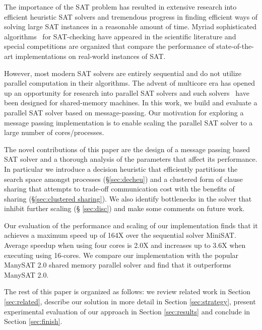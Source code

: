 \documentclass[letterpaper, compsoc, conference]{IEEEtran}
\begin{document}
The importance of the SAT problem has resulted in extensive research into
efficient heuristic SAT solvers and tremendous progress in finding efficient
ways of solving large SAT instances in a reasonable amount of time.  Myriad
sophisticated algorithms~\cite{Davis1962, Selman1992, Zhang94sato,
Selman95localsearch, PSATO, Bohm96, Silva1997GRASP, Moskewicz2001Chaff,
Forman02NagSat, MiniSat, Blochinger2003, Chrabakh03gradsat, Jurkowiak2005,
Lewis2007MiraXT, PMiniSat, Gil08Pmsat, ManySAT} for SAT-checking have appeared
in the scientific literature and special competitions \cite{SATRace2008} are
organized that compare the performance of state-of-the-art implementations on
real-world instances of SAT. 

However, most modern SAT solvers are entirely sequential and do not utilize
parallel computation in their algorithms. The advent of multicore era has
opened up an opportunity for research into parallel SAT solvers and such 
solvers~\cite{ManySAT} have been designed for shared-memory
machines.  In this work, we build and evaluate a parallel SAT solver based on
message-passing. Our motivation for exploring a message passing implementation
is to enable scaling the parallel SAT solver to a large number of
cores/processes.

The novel contributions of this paper are the design of a message passing based
SAT solver and a thorough analysis of the parameters that affect its
performance. In particular we introduce a decision heuristic that efficiently
partitions the search space amongst processes (\S\ref{sec:decheu}) and 
a clustered form of clause sharing that attempts to trade-off communication
cost with the benefits of sharing (\S\ref{sec:clustered sharing}). We also
identify bottlenecks in the solver that inhibit further scaling (\S
\ref{sec:disc}) and make some comments on future work.  

Our evaluation of the performance and scaling of our implementation finds that
it achieves a maximum speed up of 164X over the sequential solver MiniSAT.
Average speedup when using four cores is 2.0X and increases up to 3.6X when
executing using 16-cores. We compare our implementation with the popular
ManySAT 2.0 shared memory parallel solver and find that it outperforms ManySAT
2.0. 

The rest of this paper is organized as follows: we review related work in
Section \ref{sec:related}, describe our solution in more detail in Section
\ref{sec:strategy}, present experimental evaluation of our approach in Section
\ref{sec:results} and conclude in Section \ref{sec:finish}.
\end{document}
